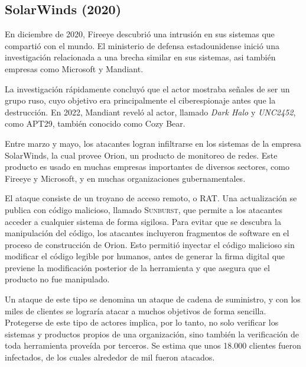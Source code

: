 \documentclass{article}
\begin{document}

\subsection{SolarWinds (2020)}
En diciembre de 2020, Fireeye descubrió una intrusión en sus sistemas que compartió con el mundo. El ministerio de defensa estadounidense inició una investigación relacionada a una brecha similar en sus sistemas, asi también empresas como Microsoft y Mandiant. \autocite{wired-solarwinds} \autocite{npr-solarwinds}

La investigación rápidamente concluyó que el actor mostraba señales de ser un grupo ruso, cuyo objetivo era principalmente el ciberespionaje antes que la destrucción. En 2022, Mandiant reveló al actor, llamado {\it Dark Halo} y {\it UNC2452}, como APT29, también conocido como Cozy Bear.

Entre marzo y mayo, los atacantes logran infiltrarse en los sistemas de la empresa SolarWinds, la cual provee Orion, un producto de monitoreo de redes. Este producto es usado en muchas empresas importantes de diversos sectores, como Fireeye y Microsoft, y en muchas organizaciones gubernamentales.

El ataque consiste de un troyano de acceso remoto, o RAT. Una actualización se publica con código malicioso, llamado \textsc{Sunburst}, que permite a los atacantes acceder a cualquier sistema de forma sigilosa. Para evitar que se descubra la manipulación del código, los atacantes incluyeron fragmentos de software en el proceso de construcción de Orion. Esto permitió inyectar el código malicioso sin modificar el código legible por humanos, antes de generar la firma digital que previene la modificación posterior de la herramienta y que asegura que el producto no fue manipulado.

Un ataque de este tipo se denomina un ataque de cadena de suministro, y con los miles de clientes se lograría atacar a muchos objetivos de forma sencilla. Protegerse de este tipo de actores implica, por lo tanto, no solo verificar los sistemas y productos propios de una organización, sino también la verificación de toda herramienta proveída por terceros. Se estima que unos 18.000 clientes fueron infectados, de los cuales alrededor de mil fueron atacados.
\end{document}
